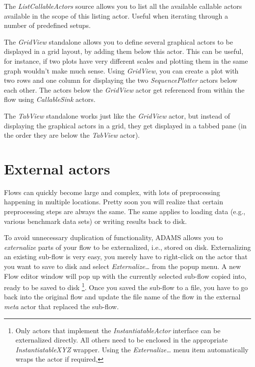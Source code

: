 The \textit{ListCallableActors} source allows you to list all the available callable
actors available in the scope of this listing actor. Useful when iterating through
a number of predefined setups.

The \textit{GridView} standalone allows you to define several graphical actors
to be displayed in a grid layout, by adding them below this actor. This can be
useful, for instance, if two plots have very different scales and plotting them
in the same graph wouldn't make much sense. Using \textit{GridView}, you can create
a plot with two rows and one column for displaying the two \textit{SequencePlotter}
actors below each other. The actors below the \textit{GridView} actor get
referenced from within the flow using \textit{CallableSink} actors.

The \textit{TabView} standalone works just like the \textit{GridView} actor,
but instead of displaying the graphical actors in a grid, they get displayed
in a tabbed pane (in the order they are below the \textit{TabView} actor).

\clearpage
\section{External actors}
\label{external_actors}
Flows can quickly become large and complex, with lots of preprocessing
happening in multiple locations. Pretty soon you will realize that certain
preprocessing steps are always the same. The same applies to loading data
(e.g., various benchmark data sets) or writing results back to disk.

To avoid unnecessary duplication of functionality, ADAMS allows you to
\textit{externalize} parts of your flow to be externalized, i.e., stored on
disk. Externalizing an existing sub-flow is very easy, you merely have to
right-click on the actor that you want to save to disk and select
\textit{Externalize\ldots} from the popup menu. A new Flow editor window will
pop up with the currently selected sub-flow copied into, ready to be saved to
disk \footnote{Only actors that implement the \textit{InstantiatableActor}
interface can be externalized directly. All others need to be enclosed in the
appropriate \textit{InstantiatableXYZ} wrapper. Using the
\textit{Externalize\ldots} menu item automatically wraps the actor if
required,}. Once you saved the sub-flow to a file, you have to go back into the
original flow and update the file name of the flow in the external \textit{meta}
actor that replaced the sub-flow.

